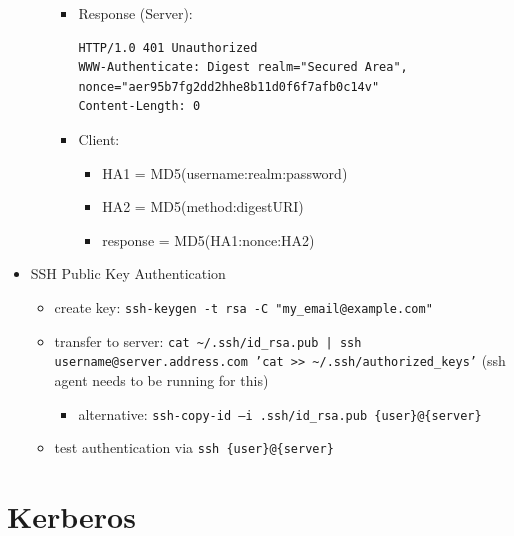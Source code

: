 \documentclass[11pt]{article}
\begin{document}
\begin{itemize}
\begin{itemize}
\begin{itemize}
\item Response (Server):
\lstset{breaklines=true,language=bash,label= ,caption= ,captionpos=b,numbers=none}
\begin{lstlisting}
HTTP/1.0 401 Unauthorized
WWW-Authenticate: Digest realm="Secured Area",
nonce="aer95b7fg2dd2hhe8b11d0f6f7afb0c14v"
Content-Length: 0
\end{lstlisting}
\item Client:
\begin{itemize}
\item HA1 = MD5(username:realm:password)
\item HA2 = MD5(method:digestURI)
\item response = MD5(HA1:nonce:HA2)
\end{itemize}
\end{itemize}
\end{itemize}
\item SSH Public Key Authentication
\begin{itemize}
\item create key: \texttt{ssh-keygen -t rsa -C "my\_email@example.com"}
\item transfer to server: \texttt{cat \textasciitilde{}/.ssh/id\_rsa.pub | ssh username@server.address.com 'cat >> \textasciitilde{}/.ssh/authorized\_keys'} (ssh agent needs to be running for this)
\begin{itemize}
\item alternative: \texttt{ssh-copy-id –i .ssh/id\_rsa.pub \{user\}@\{server\}}
\end{itemize}
\item test authentication via \texttt{ssh \{user\}@\{server\}}
\end{itemize}
\end{itemize}
\section{Kerberos}
\label{sec:org434d97a}
\end{document}
